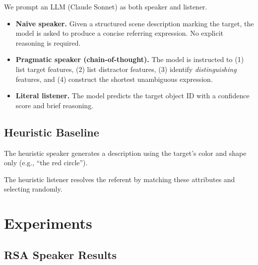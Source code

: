 \documentclass[10pt]{article}
\begin{document}
We prompt an LLM (Claude Sonnet) as both speaker and listener.

\begin{itemize}[noitemsep, topsep=0pt]
    \item \textbf{Naive speaker.} Given a structured scene description marking the target, the model is asked to produce a concise referring expression. No explicit reasoning is required.
    
    \item \textbf{Pragmatic speaker (chain-of-thought).} The model is instructed to (1) list target features, (2) list distractor features, (3) identify \emph{distinguishing} features, and (4) construct the shortest unambiguous expression. 
    
    \item \textbf{Literal listener.} The model predicts the target object ID with a confidence score and brief reasoning.
\end{itemize}

\subsection{Heuristic Baseline}

The heuristic speaker generates a description using the target's color and shape only (e.g., ``the red circle'').

The heuristic listener resolves the referent by matching these attributes and selecting randomly.

\section{Experiments}
\label{sec:experiments}

\subsection{RSA Speaker Results}
\end{document}
